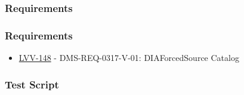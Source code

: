 \hypertarget{requirements-20}{%
\subsubsection{Requirements}\label{requirements-20}}

\hypertarget{requirements-21}{%
\subsubsection{Requirements}\label{requirements-21}}

\begin{itemize}
\tightlist
\item
  \href{https://jira.lsstcorp.org/browse/LVV-148}{LVV-148} -
  DMS-REQ-0317-V-01: DIAForcedSource Catalog
\end{itemize}

\hypertarget{test-script-10}{%
\subsubsection{Test Script}\label{test-script-10}}

